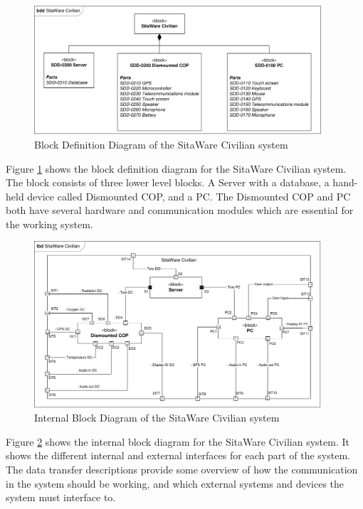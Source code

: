 \begin{figure}[H]
\centering
\includegraphics[width=0.95\textwidth]
{Billeder/background/bdd_overordnet.pdf}
\caption{Block Definition Diagram of the SitaWare Civilian system}
\label{fig:system_bdd}
\end{figure}

Figure \ref{fig:system_bdd} shows the block definition diagram for the SitaWare Civilian system. The block consists of three lower level blocks. A Server with a database, a hand-held device called Dismounted COP, and a PC. The Dismounted COP and PC both have several hardware and communication modules which are essential for the working system.

\begin{figure}[H]
\centering
\includegraphics[width=0.95\textwidth]
{Billeder/background/ibd_overordnet.pdf}
\caption{Internal Block Diagram of the SitaWare Civilian system}
\label{fig:system_ibd}
\end{figure}

Figure \ref{fig:system_ibd} shows the internal block diagram for the SitaWare Civilian system. It shows the different internal and external interfaces for each part of the system. The data transfer descriptions provide some overview of how the communication in the system should be working, and which external systems and devices the system must interface to.

